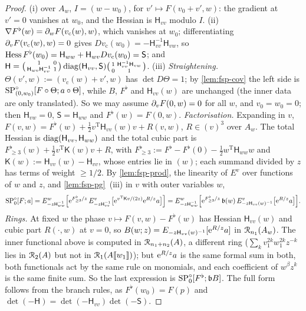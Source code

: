 \begin{proof}
(i)  over $A_w$, $I=(w-w_0)$, for $v'\mapsto F(v_0+v',w)$: the gradient at $v'=0$ vanishes at $w_0$, and the Hessian is $\mathsf H_{vv}$ modulo $I$.
(ii) $\nabla F^\flat(w)=\partial_wF(v_{\mathrm c}(w),w)$, which vanishes at $w_0$; differentiating $\partial_vF(v_{\mathrm c}(w),w)=0$ gives $Dv_{\mathrm c}(w_0)=-\mathsf H_{vv}^{-1}\mathsf H_{vw}$, so $\operatorname{Hess} F^\flat(w_0)=\mathsf H_{ww}+\mathsf H_{wv}Dv_{\mathrm c}(w_0)=\mathsf S$; and $\mathsf H=\bigl(\begin{smallmatrix}1&0\\ \mathsf H_{wv}\mathsf H_{vv}^{-1}&1\end{smallmatrix}\bigr)\operatorname{diag}(\mathsf H_{vv},\mathsf S)\bigl(\begin{smallmatrix}1&\mathsf H_{vv}^{-1}\mathsf H_{vw}\\0&1\end{smallmatrix}\bigr)$.
(iii) \emph{Straightening.} $\Theta(v',w):=(v_{\mathrm c}(w)+v',w)$ has $\det D\Theta=1$; by \cref{lem:fsp-cov} the left side is $\mathrm{SP}^{\circ}_{(0,w_0)}[F\circ\Theta;a\circ\Theta]$, while $B$, $F^\flat$ and $\mathsf H_{vv}(w)$ are unchanged (the inner data are only translated). So we may assume $\partial_vF(0,w)=0$ for all $w$, and $v_0=w_0=0$; then $\mathsf H_{vw}=0$, $\mathsf S=\mathsf H_{ww}$ and $F^\flat(w)=F(0,w)$.
\emph{Factorisation.} Expanding in $v$, $F(v,w)=F^\flat(w)+\frac12v^{\mathrm T}\mathsf H_{vv}(w)v+R(v,w)$, $R\in(v)^3$ over $A_w$. The total Hessian is $\operatorname{diag}(\mathsf H_{vv},\mathsf H_{ww})$ and the total cubic part is $F^\flat_{\geq3}(w)+\frac12v^{\mathrm T}\mathsf K(w)v+R$, with $F^\flat_{\geq3}:=F^\flat-F^\flat(0)-\frac12w^{\mathrm T}\mathsf H_{ww}w$ and $\mathsf K(w):=\mathsf H_{vv}(w)-\mathsf H_{vv}$, whose entries lie in $(w)$; each summand divided by $z$ has terms of weight $\geq1/2$. By \cref{lem:fsp-prod}, the linearity of $E^v$ over functions of $w$ and $z$, and \cref{lem:fsp-pg}~(iii) in $v$ with outer variables $w$,
\[
\mathrm{SP}^{\circ}_0[F;a]=E^w_{-z\mathsf H_{ww}^{-1}}\Bigl[\mathrm{e}^{F^\flat_{\geq3}/z}\,E^v_{-z\mathsf H_{vv}^{-1}}\bigl[\mathrm{e}^{v^{\mathrm T}\mathsf Kv/(2z)}\mathrm{e}^{R/z}a\bigr]\Bigr]=E^w_{-z\mathsf H_{ww}^{-1}}\Bigl[\mathrm{e}^{F^\flat_{\geq3}/z}\,\mathfrak b(w)\,E^v_{-z\mathsf H_{vv}(w)^{-1}}\bigl[\mathrm{e}^{R/z}a\bigr]\Bigr].
\]
\emph{Rings.} At fixed $w$ the phase $v\mapsto F(v,w)-F^\flat(w)$ has Hessian $\mathsf H_{vv}(w)$ and cubic part $R(\cdot,w)$ at $v=0$, so $B(w;z)=E_{-z\mathsf H_{vv}(w)^{-1}}[\mathrm{e}^{R/z}a]$ in $\mathcal{R}_{n_1}(A_w)$. The inner functional above is computed in $\mathcal{R}_{n_1+n_2}(A)$, a different ring ($\sum_kv_1^{2k}w_1^{2k}z^{-k}$ lies in $\mathcal{R}_2(A)$ but not in $\mathcal{R}_1(A[\![ w_1 ]\!])$); but $\mathrm{e}^{R/z}a$ is the same formal sum in both, both functionals act by the same rule on monomials, and each coefficient of $w^\beta z^k$ is the same finite sum. So the last expression is $\mathrm{SP}^{\circ}_0[F^\flat;\mathfrak bB]$. The full form follows from the branch rules, as $F^\flat(w_0)=F(p)$ and $\det(-\mathsf H)=\det(-\mathsf H_{vv})\det(-\mathsf S)$.
\end{proof}


